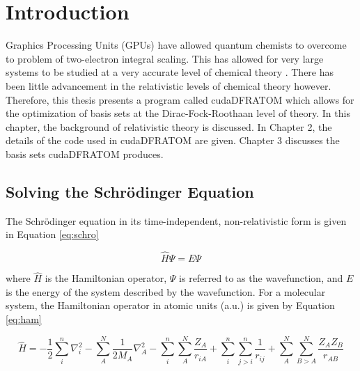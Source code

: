\chapter{Introduction}

Graphics Processing Units (GPUs) have allowed quantum chemists to overcome to problem of two-electron integral scaling\cite{terachem_1,terachem_2,terachem_3,terachem_4}. This has allowed for very large systems to be studied at a very accurate level of chemical theory \cite{terachem_5}. There has been little advancement in the relativistic levels of chemical theory however. Therefore, this thesis presents a program called cudaDFRATOM which allows for the optimization of basis sets at the Dirac-Fock-Roothaan level of theory. In this chapter, the background of relativistic theory is discussed. In Chapter 2, the details of the code used in cudaDFRATOM are given. Chapter 3 discusses the basis sets cudaDFRATOM produces.

\section{Solving the Schr\"{o}dinger Equation}
The Schr\"{o}dinger equation\cite{1926PhRv...28.1049S} in its time-independent, non-relativistic form is given in Equation \ref{eq:schro} 

\begin{equation}
\label{eq:schro}
\hat{H}\Psi = E\Psi
\end{equation} 

where $\hat{H}$ is the Hamiltonian operator, $\Psi$ is referred to as the wavefunction, and $E$ is the energy of the system described by the wavefunction. For a molecular system, the Hamiltonian operator in atomic units (a.u.) is given by Equation \ref{eq:ham}

\begin{equation}
\label{eq:ham}
\hat{H} = -\frac{1}{2}\sum^{n}_{i}\nabla^{2}_{i} - \sum^{N}_{A}\frac{1}{2M_{A}}\nabla^{2}_{A} - \sum^{n}_{i}\sum^{N}_{A}\frac{Z_{A}}{r_{iA}}
+ \sum^{n}_{i}\sum^{n}_{j>i}\frac{1}{r_{ij}} + \sum^{N}_{A}\sum^{N}_{B>A}\frac{Z_{A}Z_{B}}{r_{AB}}
\end{equation} 

